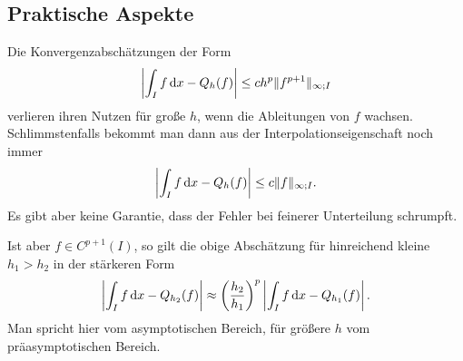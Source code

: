 \subsection{Praktische Aspekte}

\begin{remark}
  Die Konvergenzabschätzungen der Form
  \begin{gather}
    \left|\int_I f\,\mathrm{d} x - Q_h(f)\right| \le c h^p \lVert f^{p+1}\rVert_{\infty;I}
  \end{gather}
  verlieren ihren Nutzen für große $h$, wenn die Ableitungen von $f$
  wachsen. Schlimmstenfalls bekommt man dann aus der
  Interpolationseigenschaft noch immer
  \begin{gather}
    \left|\int_I f\,\mathrm{d} x - Q_h(f)\right| \le c \lVert f\rVert_{\infty;I}.
  \end{gather}
  Es gibt aber keine Garantie, dass der Fehler bei feinerer
  Unterteilung schrumpft.
  
  Ist aber $f\in C^{p+1}(I)$, so gilt die obige Abschätzung für
  hinreichend kleine $h_1>h_2$ in der stärkeren Form
  \begin{gather}
    \left|\int_I f\,\mathrm{d} x - Q_{h_2}(f)\right|
    \approx \left(\frac{h_2}{h_1}\right)^p
    \left|\int_I f\,\mathrm{d} x - Q_{h_1}(f)\right|.
  \end{gather}
  Man spricht hier vom asymptotischen Bereich, für größere $h$ vom
  präasymptotischen Bereich.
\end{remark}

